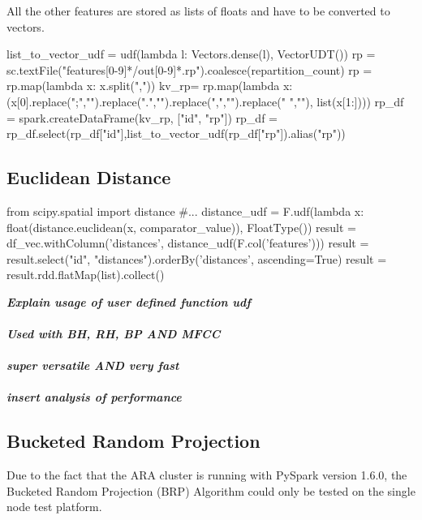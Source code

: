 \noindent All the other features are stored as lists of floats and have to be converted to vectors.  

\begin{pythonCode}[frame=single,label={lst:rpp},caption={rp preprocessing},captionpos=b]
list_to_vector_udf = udf(lambda l: Vectors.dense(l), VectorUDT())
rp = sc.textFile("features[0-9]*/out[0-9]*.rp").coalesce(repartition_count)
rp = rp.map(lambda x: x.split(","))
kv_rp= rp.map(lambda x: (x[0].replace(";","").replace(".","").replace(",","").replace(" ",""), list(x[1:])))
rp_df = spark.createDataFrame(kv_rp, ["id", "rp"])
rp_df = rp_df.select(rp_df["id"],list_to_vector_udf(rp_df["rp"]).alias("rp"))
\end{pythonCode}

\subsection{Euclidean Distance}

\begin{pythonCode}[frame=single,label={lst:euc},caption={euclidean distance},captionpos=b]
from scipy.spatial import distance
#...
distance_udf = F.udf(lambda x: float(distance.euclidean(x, comparator_value)), FloatType())
result = df_vec.withColumn('distances', distance_udf(F.col('features')))
result = result.select("id", "distances").orderBy('distances', ascending=True)
result = result.rdd.flatMap(list).collect()
\end{pythonCode}

\noindent\textit{\textbf{Explain usage of user defined function udf\\}}
\ \\
\noindent\textit{\textbf{Used with BH, RH, BP AND MFCC\\}}
\ \\
\noindent\textit{\textbf{super versatile AND very fast\\}}
\ \\
\noindent\textit{\textbf{insert analysis of performance\\}}

\subsection{Bucketed Random Projection}

Due to the fact that the ARA cluster is running with PySpark version 1.6.0, the Bucketed Random Projection (BRP) Algorithm could only be tested on the single node test platform. 

